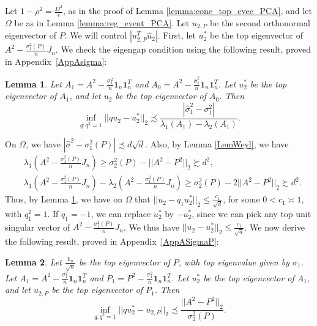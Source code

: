 \documentclass{article}
\newtheorem{lemma}{Lemma}
\newcommand{\sigmahat}{\ensuremath{\widehat{\sigma}}}
\begin{document}
Let $1 - \rho^2 = \frac{D^2}{\epsilon}$, as in the proof of Lemma \ref{lemma:conc_top_evec_PCA}, and let $\Omega$ be as in Lemma \ref{lemma:reg_event_PCA}. Let $u_{2, P}$ be the second orthonormal eigenvector of $P$. We will control $|u_{2, P}^T\hat{u}_2|$. First, let $u_2^*$ be the top eigenvector of $A^2 - \frac{\sigma_1^2(P)}{n}J_n$. We check the eigengap condition using the following result, proved in Appendix~\ref{AppAsigma}:

\begin{lemma}
\label{lemma:Asigma_A_sigmahat}
Let $A_1 = A^2 - \frac{\sigma_1^2}{n} \textbf{1}_n\textbf{1}_n^T$ and $A_0 = A^2 - \frac{\sigmahat_1^2}{n} \textbf{1}_n\textbf{1}_n^T$. Let $u_2^*$ be the top eigenvector of $A_1$, and let $u_2$ be the top eigenvector of $A_0$. Then
\begin{equation*}
\mathop{\inf}_{q: q^2 = 1}||qu_2 - u_2^*||_2 \precsim \frac{|\sigmahat_1^2 - \sigma_1^2|}{\lambda_1(A_1) - \lambda_2(A_1)}.
\end{equation*}
\end{lemma}

On $\Omega$, we have $|\sigmahat^2 - \sigma_1^2(P)| \precsim d\sqrt{d}$. Also, by Lemma \ref{LemWeyl}, we have 
\begin{align*}
&\lambda_1\left(A^2 - \frac{\sigma_1^2(P)}{n}J_n\right) \geq \sigma_2^2(P) - ||A^2 - P^2||_2 \succsim d^2,\\
&\lambda_1\left(A^2 - \frac{\sigma_1^2(P)}{n}J_n\right) - \lambda_2\left(A^2 - \frac{\sigma_1^2(P)}{n}J_n\right) \geq \sigma_2^2(P) - 2||A^2 - P^2||_2 \succsim d^2.
\end{align*}
Thus, by Lemma \ref{lemma:Asigma_A_sigmahat}, we have on $\Omega$ that $||u_2 - q_1u_2^*||_2 \leq\frac{c_1}{\sqrt{d}}$, for some $0 < c_1 \asymp 1$, with $q_1^2 = 1$. If $q_1 = -1$, we can replace $u_2^*$ by $-u_2^*$, since we can pick any top unit singular vector of $A^2 - \frac{\sigma_1^2(P)}{n}J_n$. We thus have $||u_2 - u_2^*||_2 \leq\frac{c_1}{\sqrt{d}}$. We now derive the following result, proved in Appendix~\ref{AppASigmaP}:

\begin{lemma}
\label{lemma:A_sigma_P_sigma}
Let $\frac{\mathbf{1}_n}{\sqrt{n}}$ be the top eigenvector of $P$, with top eigenvalue given by $\sigma_1$. Let $A_1 = A^2 - \frac{\sigma_1^2}{n} \textbf{1}_n\textbf{1}_n^T$ and $P_1 = P^2 - \frac{\sigma_1^2}{n} \textbf{1}_n\textbf{1}_n^T$. Let $u_2^*$ be the top eigenvector of $A_1$, and let $u_{2, P}$ be the top eigenvector of $P_1$. Then
\begin{equation*}
\mathop{\inf}_{q: q^2 = 1}||qu_2^* - u_{2, P}||_2 \precsim \frac{||A^2 - P^2||_2}{\sigma_2^2(P)}.
\end{equation*}
\end{lemma}
\end{document}

